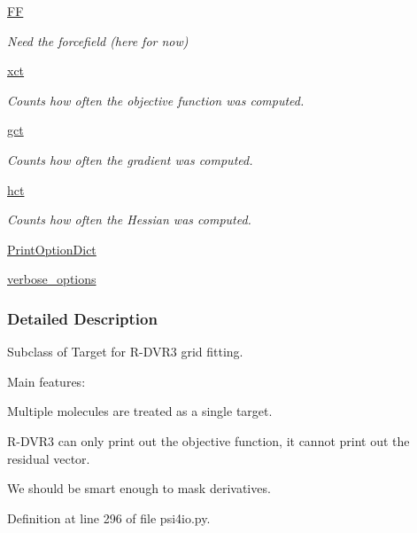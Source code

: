 \begin{DoxyCompactItemize}
\hyperlink{classforcebalance_1_1target_1_1Target_a38a37919783141ea37fdcf8b00ce0aaf}{F\-F}
\begin{DoxyCompactList}\small\item\em Need the forcefield (here for now) \end{DoxyCompactList}\item 
\hyperlink{classforcebalance_1_1target_1_1Target_aad2e385cfbf7b4a68f1c2cb41133fe82}{xct}
\begin{DoxyCompactList}\small\item\em Counts how often the objective function was computed. \end{DoxyCompactList}\item 
\hyperlink{classforcebalance_1_1target_1_1Target_aa625ac88c6744eb14ef281d9496d0dbb}{gct}
\begin{DoxyCompactList}\small\item\em Counts how often the gradient was computed. \end{DoxyCompactList}\item 
\hyperlink{classforcebalance_1_1target_1_1Target_a5b5a42f78052b47f29ed4b940c6111a1}{hct}
\begin{DoxyCompactList}\small\item\em Counts how often the Hessian was computed. \end{DoxyCompactList}\item 
\hyperlink{classforcebalance_1_1BaseClass_afc6659278497d7245bc492ecf405ccae}{Print\-Option\-Dict}
\item 
\hyperlink{classforcebalance_1_1BaseClass_afd68efa29ccd2f320f4cf82198214aac}{verbose\-\_\-options}
\end{DoxyCompactItemize}


\subsubsection{Detailed Description}
Subclass of Target for R-\/\-D\-V\-R3 grid fitting. 

Main features\-:
\begin{DoxyItemize}
\item Multiple molecules are treated as a single target.
\item R-\/\-D\-V\-R3 can only print out the objective function, it cannot print out the residual vector.
\item We should be smart enough to mask derivatives. 
\end{DoxyItemize}

Definition at line 296 of file psi4io.\-py.



